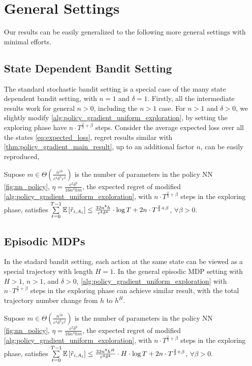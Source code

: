 \section{General Settings}
\label{sec:general_settings}

Our results can be easily generalized to the following more general settings with minimal efforts.

\subsection{State Dependent Bandit Setting}

The standard stochastic bandit setting is a special case of the many state dependent bandit setting, with $n = 1$ and $\delta = 1$. Firstly, all the intermediate results work for general $n > 0$, including the $n > 1$ case.
For $n > 1$ and $\delta > 0$, we slightly modify \cref{alg:policy_gradient_uniform_exploration}, by setting the exploring phase have $n \cdot T^{\frac{2}{3} + \beta}$ steps. Consider the average expected loss over all the states \cref{eq:expected_loss}, regret results similar with \cref{thm:policy_gradient_main_result}, up to an additional factor $n$, can be easily reproduced,
\begin{thm}
\label{thm:many_state_dependent_bandit_setting}
     Supose $m \in \Theta\left( \frac{n^{10}}{c^4 \delta^4 \varepsilon^2} \right)$ is the number of parameters in the policy NN \cref{fig:nn_policy}, $\eta = \frac{c^2 \delta^2}{16 n^4 h m}$, the expected regret of modified \cref{alg:policy_gradient_uniform_exploration}, with $n \cdot T^{\frac{2}{3}+\beta}$ steps in the exploring phase, satisfies $\sum\limits_{t=0}^{T-1}{ {\mathbb{E}} \left[ \tilde{r}_{i, A_t} \right] } \le  \frac{32n^8h}{ c^4 \delta^4} \cdot \log{T} + 2n \cdot T^{\frac{2}{3} + \beta }$, $\forall \beta > 0$.
\end{thm}

\subsection{Episodic MDPs}

In the stadard bandit setting, each action at the same state can be viewed as a special trajectory with length $H = 1$. In the general episodic MDP setting with $H > 1$, $n > 1$, and $\delta > 0$, \cref{alg:policy_gradient_uniform_exploration} with $n \cdot T^{\frac{2}{3}+\beta}$ steps in the exploring phase can achieve similar result, with the total trajectory number change from $h$ to $h^H$.
\begin{thm}
\label{thm:episodic_mdp_setting}
     Supose $m \in \Theta\left( \frac{n^{10}}{c^4 \delta^4 \varepsilon^2} \right)$ is the number of parameters in the policy NN \cref{fig:nn_policy}, $\eta = \frac{c^2 \delta^2}{16 n^4 h m}$, the expected regret of modified \cref{alg:policy_gradient_uniform_exploration}, with $n \cdot T^{\frac{2}{3}+\beta}$ steps in the exploring phase, satisfies $\sum\limits_{t=0}^{T-1}{ {\mathbb{E}} \left[ \tilde{r}_{i, A_t} \right] } \le  \frac{32n^8h^H}{ c^4 \delta^4} \cdot H \cdot \log{T} + 2n \cdot T^{\frac{2}{3} + \beta }$, $\forall \beta > 0$.
\end{thm}


